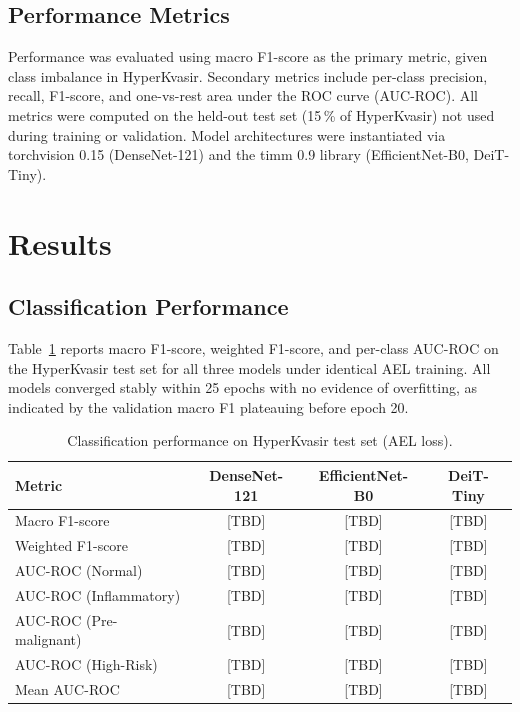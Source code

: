 \documentclass[10pt,a4paper,twocolumn]{article}
\begin{document}
\subsection{Performance Metrics}

Performance was evaluated using macro F1-score as the primary metric, given
class imbalance in HyperKvasir. Secondary metrics include per-class
precision, recall, F1-score, and one-vs-rest area under the ROC curve
(AUC-ROC). All metrics were computed on the held-out test set (15\,\% of
HyperKvasir) not used during training or validation. Model architectures were
instantiated via torchvision 0.15 (DenseNet-121) and the timm 0.9 library
(EfficientNet-B0, DeiT-Tiny).

\section{Results}
\label{sec:results}

\subsection{Classification Performance}

Table~\ref{tab:main_perf} reports macro F1-score, weighted F1-score, and
per-class AUC-ROC on the HyperKvasir test set for all three models under
identical AEL training. All models converged stably within 25 epochs with no
evidence of overfitting, as indicated by the validation macro F1 plateauing
before epoch 20.

\begin{table}[htbp]
\centering
\caption{Classification performance on HyperKvasir test set (AEL loss).}
\label{tab:main_perf}
\begin{tabular}{lccc}
\toprule
\textbf{Metric} & \textbf{DenseNet-121} & \textbf{EfficientNet-B0} &
\textbf{DeiT-Tiny}\\
\midrule
Macro F1-score          & [TBD] & [TBD] & [TBD]\\
Weighted F1-score       & [TBD] & [TBD] & [TBD]\\
AUC-ROC (Normal)        & [TBD] & [TBD] & [TBD]\\
AUC-ROC (Inflammatory)  & [TBD] & [TBD] & [TBD]\\
AUC-ROC (Pre-malignant) & [TBD] & [TBD] & [TBD]\\
AUC-ROC (High-Risk)     & [TBD] & [TBD] & [TBD]\\
Mean AUC-ROC            & [TBD] & [TBD] & [TBD]\\
\bottomrule
\end{tabular}
\end{table}
\end{document}
